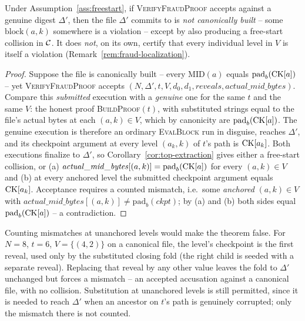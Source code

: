 \begin{theorem}
\label{thm:fraud-soundness}
Under Assumption~\ref{ass:freestart}, if \textsc{VerifyFraudProof} accepts
against a genuine digest $\Delta'$, then the file $\Delta'$ commits to is
\emph{not canonically built} -- some $\mathrm{block}(a,k)$ somewhere is a
violation -- except by also producing a free-start collision in $\mathcal{C}$. It
does \emph{not}, on its own, certify that every individual level in $V$ is
itself a violation (Remark~\ref{rem:fraud-localization}).
\end{theorem}

\begin{proof}
Suppose the file is canonically built -- every $\mathrm{MID}(a)$ equals
$\mathrm{pad}_b(\mathrm{CK}[a])$ -- yet \textsc{VerifyFraudProof} accepts
$(N, \Delta', t, V, d_0, d_1, \mathit{reveals}, \mathit{actual\_mid\_bytes})$.
Compare this \emph{submitted} execution with a \emph{genuine} one for the
same $t$ and the same $V$: the honest proof \textsc{BuildProof}$(t)$, with
substituted strings equal to the file's actual bytes at each $(a,k) \in V$,
which by canonicity are $\mathrm{pad}_b(\mathrm{CK}[a])$. The genuine execution is
therefore an ordinary \textsc{EvalBlock} run in disguise, reaches
$\Delta'$, and its checkpoint argument at every level $(a_k,k)$ of $t$'s
path is $\mathrm{CK}[a_k]$. Both executions finalize to $\Delta'$, so
Corollary~\ref{cor:top-extraction} gives either a free-start collision, or
(a) $\mathit{actual\_mid\_bytes}[(a,k)] = \mathrm{pad}_b(\mathrm{CK}[a])$ for every
$(a,k) \in V$ and (b) at every anchored level the submitted checkpoint
argument equals $\mathrm{CK}[a_k]$. Acceptance requires a counted mismatch, i.e.\
some \emph{anchored} $(a,k) \in V$ with $\mathit{actual\_mid\_bytes}[(a,k)]
\ne \mathrm{pad}_b(\mathit{ckpt})$; by (a) and (b) both sides equal
$\mathrm{pad}_b(\mathrm{CK}[a])$ -- a contradiction.
\end{proof}

\begin{remark}
\label{rem:fraud-anchoring}
Counting mismatches at unanchored levels would make the theorem false.
For $N=8$, $t=6$, $V=\{(4,2)\}$ on a canonical file, the level's
checkpoint is the first reveal, used only by the substituted closing fold
(the right child is seeded with a separate reveal). Replacing that reveal
by any other value leaves the fold to $\Delta'$ unchanged but forces a
mismatch -- an accepted accusation against a canonical file, with no
collision. Substitution at unanchored levels is still permitted, since it
is needed to reach $\Delta'$ when an ancestor on $t$'s path is genuinely
corrupted; only the mismatch there is not counted.
\end{remark}

